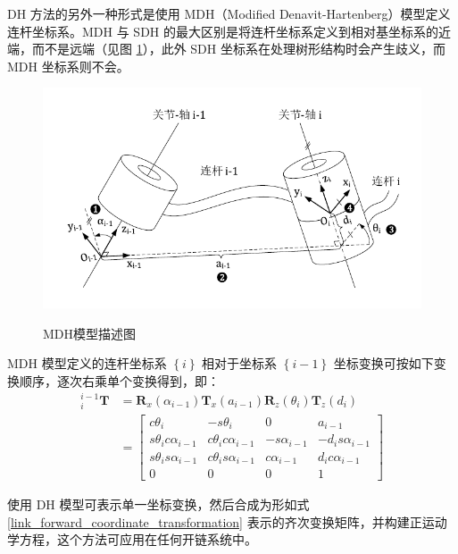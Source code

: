 \documentclass[cn,11pt,chinese,blue,bibstyle=ieeetr]{elegantbook}
\begin{document}
DH 方法的另外一种形式是使用 MDH（Modified Denavit-Hartenberg）模型定义连杆坐标系。MDH 与 SDH 的最大区别是将连杆坐标系定义到相对基坐标系的近端，而不是远端（见图 \ref{mdh_model_description}），此外 SDH 坐标系在处理树形结构时会产生歧义，而 MDH 坐标系则不会。

\begin{figure}[htbp]
	\centering
	\includegraphics[scale=1.2]{images//mdh_model.pdf} \\
	\caption{MDH模型描述图}
	\label{mdh_model_description}
\end{figure}

MDH 模型定义的连杆坐标系 $\left\{i\right\}$ 相对于坐标系 $\left\{i-1\right\}$ 坐标变换可按如下变换顺序，逐次右乘单个变换得到，即：
\begin{equation}\label{mdh_model_adjacent_link_forward_coordinate_transformation}
	\begin{aligned}
		{_i^{i-1}\bm{T}} &= \bm{R}_x\left(\alpha_{i-1}\right)\bm{T}_x\left(a_{i-1}\right)\bm{R}_z\left(\theta_i\right)\bm{T}_z\left(d_i\right) \\
		&= \begin{bmatrix}
			c\theta_i               & -s\theta_i              & 0              & a_{i-1} \\
			s\theta_i c\alpha_{i-1} & c\theta_i c\alpha_{i-1} & -s\alpha_{i-1} & -d_i s\alpha_{i-1} \\
			s\theta_i s\alpha_{i-1} & c\theta_i s\alpha_{i-1} & c\alpha_{i-1}  & d_i c\alpha_{i-1} \\
			0                       & 0                       & 0              & 1
		\end{bmatrix}
	\end{aligned}
\end{equation}

使用 DH 模型可表示单一坐标变换，然后合成为形如式 \ref{link_forward_coordinate_transformation} 表示的齐次变换矩阵，并构建正运动学方程，这个方法可应用在任何开链系统中。
\end{document}
